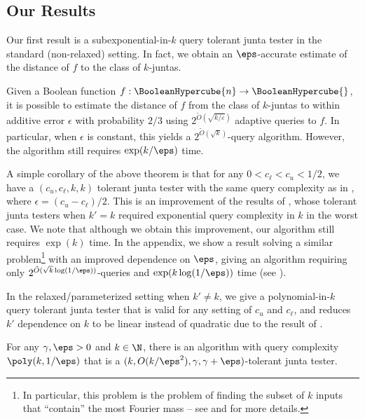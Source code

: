 \subsection{Our Results}

Our first result is a subexponential-in-$k$ query tolerant junta tester in the standard (non-relaxed) setting. In fact, we obtain an $\eps$-accurate estimate of the distance of $f$ to the class of $k$-juntas. 

\begin{theorem}
\label{theorem:main-result}
Given a Boolean function $f: \BooleanHypercube{n} \to \BooleanHypercube{}$, it is possible to estimate the distance of $f$ from the class of $k$-juntas to within additive error $\epsilon$ with probability $2/3$ using 
$ 2^{\tilde{O}(\sqrt{k/\varepsilon})}$ adaptive queries to $f$. In particular, when $\epsilon$ is constant, this yields a $2^{\tilde{O}(\sqrt{k})}$-query algorithm. However, the algorithm still requires $\exp(k/\eps)$ time.
\end{theorem}

A simple corollary of the above theorem is that for any $0 < c_\ell < c_u < 1/2$, we have a $(c_u, c_\ell, k,k)$ tolerant junta tester with the same query complexity as in , where $\epsilon = (c_u - c_\ell)/2$. This is an improvement of the results of \cite{junta-coordinate-oracles, junta-submodular-opt}, whose tolerant junta testers when $k'=k$ required exponential query complexity in $k$ in the worst case. We note that although we obtain this improvement, our algorithm still requires $\exp(k)$ time. 
%
In the appendix, we show a result solving a similar problem\footnote{In particular, this problem is the problem of finding the subset of $k$ inputs that ``contain'' the most Fourier mass -- see  and  for more details.} with an improved dependence on $\eps$, giving an algorithm requiring only $2^{\tilde{O}(\sqrt{k}\log(1/\eps))}$-queries and $\exp(k\log(1/\eps))$ time (see ).

In the relaxed/parameterized setting when $k' \neq k$, we give a polynomial-in-$k$ query tolerant junta tester that is valid for any setting of $c_u$ and $c_\ell$, and reduces $k'$ dependence on $k$ to be linear instead of quadratic due to the result of \cite[Corollary 1.6]{junta-coordinate-oracles}.

\begin{theorem}
\label{theorem:improved-dmn-intro}
For any $\gamma,\eps>0$ and $k \in \N$, there is an algorithm with query complexity $\poly(k, 1 / \eps)$ that is a $(k , O(k/\eps^2), \gamma, \gamma+\eps)$-tolerant junta tester.
\end{theorem}

